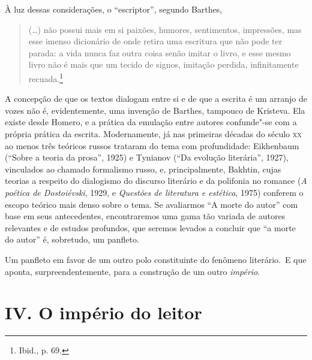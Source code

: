 À luz dessas considerações, o ``escriptor'', segundo Barthes,

\begin{quote}
(\ldots{}) não possui mais em si paixões, humores, sentimentos, impressões,
mas esse imenso dicionário de onde retira uma escritura que não pode ter
parada: a vida nunca faz outra coisa senão imitar o livro, e esse mesmo
livro não é mais que um tecido de signos, imitação perdida,
infinitamente recuada.\footnote{Ibid., p. 69.}
\end{quote}

A concepção de que os textos dialogam entre si e de que a escrita é um
arranjo de vozes não é, evidentemente, uma invenção de Barthes, tampouco
de Kristeva. Ela existe desde Homero, e a prática da emulação entre
autores confunde"-se com a própria prática da escrita. Modernamente, já nas primeiras décadas
do século \textsc{xx} ao menos três teóricos russos trataram do tema com
profundidade: Eikhenbaum (``Sobre a teoria da prosa'', 1925) e Tynianov
(``Da evolução literária'', 1927), vinculados ao chamado formalismo
russo, e, principalmente, Bakhtin, cujas teorias a respeito do
dialogismo do discurso literário e da polifonia no romance (\emph{A poética de
Dostoiévski}, 1929, e \emph{Questões de literatura e estética}, 1975) conferem o
escopo teórico mais denso sobre o tema. Se avaliarmos ``A morte do
autor'' com base em seus antecedentes, encontraremos uma gama tão
variada de autores relevantes e de estudos profundos, que seremos
levados a concluir que ``a morte do autor'' é, sobretudo, um panfleto.

Um panfleto em favor de um outro polo constituinte do fenômeno
literário.~E que aponta, surpreendentemente, para a construção de um outro \emph{império}.

\section*{IV. O império do leitor}

